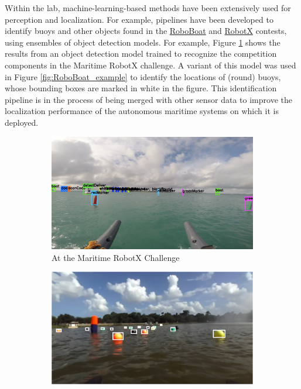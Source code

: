 \documentclass[12 pt]{article}
\begin{document}
Within the lab, machine-learning-based methods have been extensively used for perception and localization. For example, pipelines have been developed to identify buoys and other objects found in the \href{https://roboboat.org}{RoboBoat} and \href{https://robotx.org}{RobotX} contests, using ensembles of object detection models. For example, Figure \ref{fig:RobotX_example} shows the results from an object detection model trained to recognize the competition components in the Maritime RobotX challenge. A variant of this model was used in Figure \ref{fig:RoboBoat_example} to identify the locations of (round) buoys, whose bounding boxes are marked in white in the figure. This identification pipeline is in the process of being merged with other sensor data to improve the localization performance of the autonomous maritime systems on which it is deployed.
%
\begin{figure}[tb]
\centering
    \begin{subfigure}{0.48\columnwidth}
    \centering
    \includegraphics[width=\columnwidth]{figures/RobotX_YOLO_example.png}  
    \caption{At the Maritime RobotX Challenge}
    \label{fig:RobotX_example}
    \end{subfigure}
%
\hspace{0.02\columnwidth} %
%
    \begin{subfigure}{0.48\columnwidth}
    \centering
    \includegraphics[width=\columnwidth]{figures/RoboBoat2019_YOLO_obstacle.jpeg}  

\end{subfigure}
\end{figure}
\end{document}
